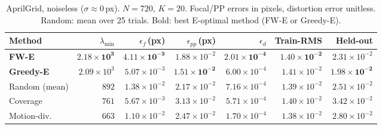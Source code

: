 \documentclass[11pt]{article}
\begin{document}
\begin{table}[ht]
\centering
\setlength{\tabcolsep}{4pt}
\caption{AprilGrid, noiseless ($\sigma{\approx}0$\,px). $N{=}720$, $K{=}20$.
Focal/PP errors in pixels, distortion error unitless.
Random: mean over 25 trials. Bold: best E-optimal method (FW-E or Greedy-E).}
\label{tab:aprilgrid_noiseless}
\begin{tabular}{lrrrrrr}
\toprule
Method & $\lambda_{\min}$ & $\epsilon_f$\,(px) & $\epsilon_{pp}$\,(px) & $\epsilon_d$ & Train-RMS & Held-out \\
\midrule
\textbf{FW-E}     & $\mathbf{2.18\!\times\!10^{3}}$ & $\mathbf{4.11\!\times\!10^{-3}}$ & $1.88\!\times\!10^{-2}$ & $\mathbf{2.01\!\times\!10^{-4}}$ & $\mathbf{1.40\!\times\!10^{-2}}$ & $2.31\!\times\!10^{-2}$ \\
\textbf{Greedy-E} & $2.09\!\times\!10^{3}$ & $5.07\!\times\!10^{-3}$ & $\mathbf{1.51\!\times\!10^{-2}}$ & $6.00\!\times\!10^{-4}$ & $1.41\!\times\!10^{-2}$ & $\mathbf{1.98\!\times\!10^{-2}}$ \\
Random (mean)     & $892$ & $1.38\!\times\!10^{-2}$ & $2.17\!\times\!10^{-2}$ & $7.16\!\times\!10^{-4}$ & $1.39\!\times\!10^{-2}$ & $2.51\!\times\!10^{-2}$ \\
Coverage          & $761$ & $5.67\!\times\!10^{-3}$ & $3.13\!\times\!10^{-2}$ & $5.71\!\times\!10^{-4}$ & $1.40\!\times\!10^{-2}$ & $3.42\!\times\!10^{-2}$ \\
Motion-div.       & $663$ & $1.10\!\times\!10^{-2}$ & $2.47\!\times\!10^{-2}$ & $1.70\!\times\!10^{-4}$ & $1.38\!\times\!10^{-2}$ & $2.80\!\times\!10^{-2}$ \\
\bottomrule
\end{tabular}
\end{table}
\end{document}

